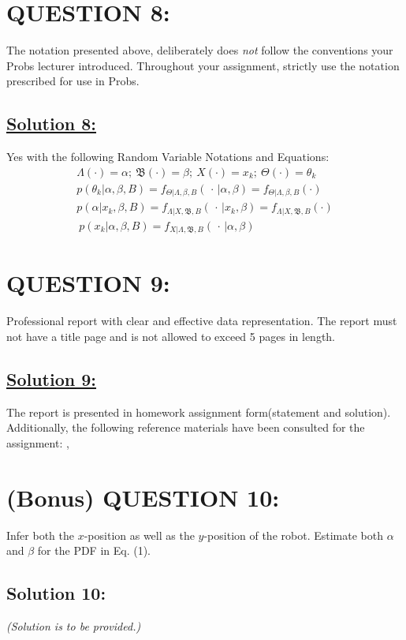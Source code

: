 \documentclass[a4paper,11pt]{article}
\begin{document}
\section{QUESTION 8:}
The notation presented above, deliberately does \emph{not} follow the conventions your Probs
lecturer introduced. Throughout your assignment, strictly use the notation prescribed for
use in Probs.
\subsection*{\underline{Solution 8:}}
\label{sec:notation}
Yes with the following Random Variable Notations and Equations: 
 	\begin{eqnarray}
		\Lambda (\cdot) = \alpha;\: \mathfrak{B}(\cdot) = \beta ; \: X(\cdot) = x_k; \: \Theta ( \cdot) = \theta_k \\		
		p(\theta_k | \alpha, \beta, B) = f_{\Theta | \Lambda, \beta, B}(\, \cdot \, | \alpha, \beta) = f_{\Theta | \Lambda, \beta, B}(\cdot)\\
		p(\alpha | x_k, \beta, B) = f_{\Lambda | X, \mathfrak{B}, B}(\, \cdot \, | x_k, \beta) = f_{\Lambda | X, \mathfrak{B}, B}(\cdot) \\\ 
		p(x_k |\alpha, \beta, B) = f_{X | \Lambda, \mathfrak{B}, B}(\, \cdot \, | \alpha, \beta)
	\end{eqnarray}

\section{QUESTION 9:}
Professional report with clear and effective data representation. The report must not have
a title page and is not allowed to exceed 5 pages in length.
\subsection*{\underline{Solution 9:}}
The report is presented in homework assignment form(statement and solution). Additionally, the following reference materials have been consulted for the assignment: \cite{leon2017probability}, \cite{bishop2006pattern}

\section{(Bonus) QUESTION 10:}
Infer both the $x$-position as well as the $y$-position of the robot. Estimate both $\alpha$ and $\beta$ for the PDF in Eq. (1).
\subsection*{Solution 10:} \emph{(Solution is to be provided.)}
\end{document}
